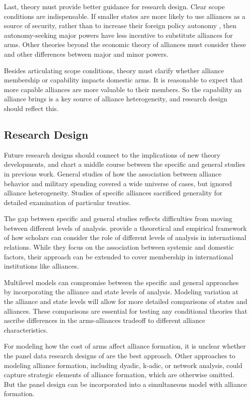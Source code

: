 \documentclass[12pt]{article}
\begin{document}
Last, theory must provide better guidance for research design. Clear scope conditions are indispensable. If smaller states are more likely to use alliances as a source of security, rather than to increase their foreign policy autonomy \citep{Morrow1991}, then autonomy-seeking major powers have less incentive to substitute alliances for arms. Other theories beyond the economic theory of alliances must consider these and other differences between major and minor powers. 

Besides articulating scope conditions, theory must clarify whether alliance membership or capability impacts domestic arms. It is reasonable to expect that more capable alliances are more valuable to their members. So the capability an alliance brings is a key source of alliance heterogeneity, and research design should reflect this.

\subsection*{Research Design} 

Future research designs should connect to the implications of new theory developments, and chart a middle course between the specific and general studies in previous work. General studies of how the association between alliance behavior and military spending covered a wide universe of cases, but ignored alliance heterogeneity. Studies of specific alliances sacrificed generality for detailed examination of particular treaties. 

The gap between specific and general studies reflects difficulties from moving between different levels of analysis. \citep{Chaudoinetal2015} provide a theoretical and empirical framework of how scholars can consider the role of different levels of analysis in international relations. While they focus on the association between systemic and domestic factors, their approach can be extended to cover membership in international institutions like alliances. 

Multilevel models can compromise between the specific and general approaches by incorporating the alliance and state levels of analysis. Modeling variation at the alliance and state levels will allow for more detailed comparisons of states and alliances. These comparisons are essential for testing any conditional theories that ascribe differences in the arms-alliances tradeoff to different alliance characteristics. 

For modeling how the cost of arms affect alliance formation, it is unclear whether the panel data research designs of \citet{Kimball2010, AllenDigiuseppe2013} are the best approach. Other approaches to modeling alliance formation, including dyadic, k-adic, or network analysis, could capture strategic elements of alliance formation, which are otherwise omitted. But the panel design can be incorporated into a simultaneous model with alliance formation. 
\end{document}
